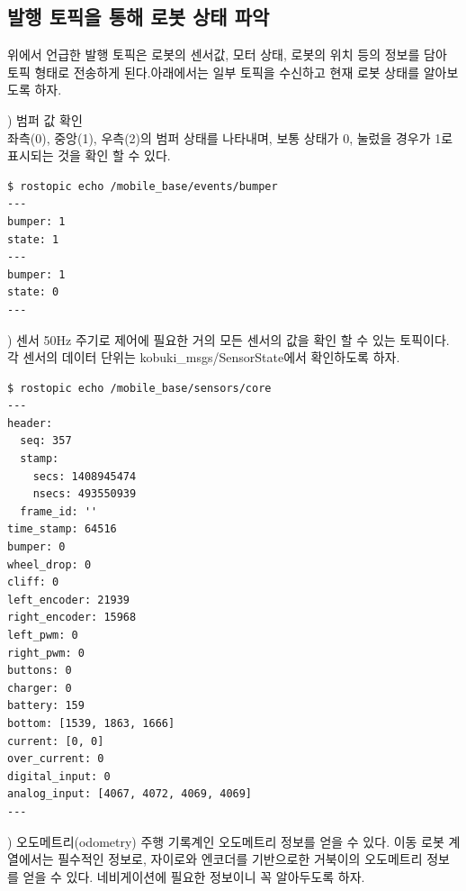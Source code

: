 \subsection{발행 토픽을 통해 로봇 상태 파악}

위에서 언급한 발행 토픽은 로봇의 센서값, 모터 상태, 로봇의 위치 등의 정보를 담아 토픽 형태로 전송하게 된다.아래에서는 일부 토픽을 수신하고 현재 로봇 상태를 알아보도록 하자.

\setcounter{num}{0}

\vspace{\baselineskip}
\noindent
{}
\thenum) 범퍼 값 확인\\
좌측(0), 중앙(1), 우측(2)의 범퍼 상태를 나타내며, 보통 상태가 0, 눌렀을 경우가 1로 표시되는 것을 확인 할 수 있다.

\vspace{\baselineskip}
\begin{lstlisting}[language=ROS]
$ rostopic echo /mobile_base/events/bumper
---
bumper: 1
state: 1
---
bumper: 1
state: 0
---
\end{lstlisting}

\vspace{\baselineskip}
\noindent
{}
\thenum) 센서
50Hz 주기로 제어에 필요한 거의 모든 센서의 값을 확인 할 수 있는 토픽이다. 각 센서의 데이터 단위는 kobuki\_msgs/SensorState에서 확인하도록 하자.

\vspace{\baselineskip}
\begin{lstlisting}[language=ROS]
$ rostopic echo /mobile_base/sensors/core
---
header: 
  seq: 357
  stamp: 
    secs: 1408945474
    nsecs: 493550939
  frame_id: ''
time_stamp: 64516
bumper: 0
wheel_drop: 0
cliff: 0
left_encoder: 21939
right_encoder: 15968
left_pwm: 0
right_pwm: 0
buttons: 0
charger: 0
battery: 159
bottom: [1539, 1863, 1666]
current: [0, 0]
over_current: 0
digital_input: 0
analog_input: [4067, 4072, 4069, 4069]
---
\end{lstlisting}

\vspace{\baselineskip}
\noindent
{}
\thenum) 오도메트리(odometry)
주행 기록계인 오도메트리 정보를 얻을 수 있다. 이동 로봇 계열에서는 필수적인 정보로, 자이로와 엔코더를 기반으로한 거북이의 오도메트리 정보를 얻을 수 있다. 네비게이션에 필요한 정보이니 꼭 알아두도록 하자.

